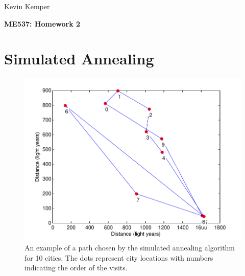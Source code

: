 \documentclass[letterpaper, 11 pt]{article}
\author{Kevin Kemper}
\begin{document}
\begin{flushright}
Kevin Kemper
\end{flushright}

\vspace{-2cm}
\begin{center}
\textbf{\huge ME537: Homework 2}
\end{center}


\thispagestyle{empty}
\pagestyle{empty}




\vspace{0.5cm}


\section{Simulated Annealing}


\begin{figure}[b]
	\centering
	\includegraphics[scale=0.6]{../figures/path_sa_T10.pdf}
	\caption{\small	An example of a path chosen by the simulated annealing
					algorithm for 10 cities.  The dots represent city locations
					with numbers indicating the order of the visits.
			}
	\label{fig:pathsa}
\end{figure}
\end{document}
